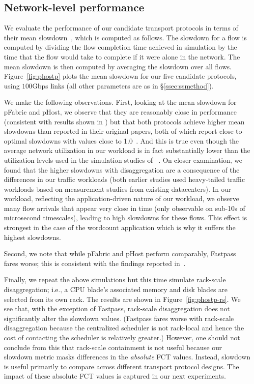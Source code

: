\subsection{Network-level performance}
\label{ssec:nlp}

We evaluate the performance of our candidate transport protocols in terms of their  mean slowdown~\cite{pfabric}, which is computed as follows. The slowdown for a flow is computed by dividing the flow completion time achieved in simulation by the time that the flow would take to complete if it were alone in the network. The mean slowdown is then computed by averaging the slowdown over all flows.
Figure~\ref{fig:phostp} plots the mean slowdown for our five candidate protocols, using $100$Gbps links (all other parameters are as in \S\ref{ssec:ssmethod}). 

We make the following observations. 
First, looking at the mean slowdown for pFabric and pHost, we observe that they are reasonably close in performance (consistent with results shown in \cite{phost}) but that both protocols achieve higher mean slowdowns than reported 
in their original papers, both of which report close-to-optimal slowdowns with values close to 1.0~\cite{phost,pfabric}. And this is true even though the average network utilization in our \dis workload is in fact substantially lower than the utilization levels used in the simulation studies of ~\cite{pfabric, phost}. 
On closer examination, we found that the higher slowdowns with disaggregation are a consequence of the differences in our traffic workloads (both earlier studies used heavy-tailed traffic workloads based on measurement 
studies from existing datacenters). In our \dis workload, reflecting the 
application-driven nature of our workload, we observe many flow arrivals that 
appear very close in time (only observable on sub-10s of microsecond timescales), leading to high slowdowns for these flows. This effect is strongest in the case of the wordcount application which is why it suffers the highest slowdowns. 

Second, we note that while pFabric and pHost perform comparably, Fastpass fares worse; this is consistent with the findings reported in~\cite{phost}.

Finally, we  repeat the above simulations but this time simulate rack-scale 
disaggregation; i.e., a CPU blade's associated memory and disk blades are selected from 
its own rack. The results are shown in Figure~\ref{fig:phostp-rs}. We see that, with the exception of Fastpass, rack-scale disaggregation does not significantly alter the slowdown values. (Fastpass fares worse with rack-scale disaggregation because the centralized scheduler is not rack-local and hence the cost of contacting the scheduler is relatively greater.)
However, one should not conclude from this that rack-scale containment is not useful because our slowdown metric masks differences in the \emph{absolute} FCT values. Instead, slowdown is useful primarily to compare across different transport protocol designs. The impact of these absolute FCT values is captured in our next experiments.

